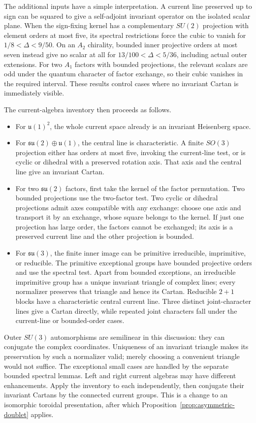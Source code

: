 The additional inputs have a simple interpretation.
A current line preserved up to sign can be squared to give a
self-adjoint invariant operator on the isolated scalar plane.
When the sign-fixing kernel has a complementary $SU(2)$
projection with element orders at most five, its spectral
restrictions force the cubic to vanish
for $1/8<\Delta<9/50$. On an $A_2$ chirality, bounded inner
projective orders at most seven instead give no scalar at all
for $13/100<\Delta<5/36$, including actual outer extensions.
For two $A_1$ factors with bounded projections, the relevant
scalars are odd under the quantum character of factor exchange,
so their cubic vanishes in the required interval. These results
control cases where no invariant Cartan is immediately visible.

The current-algebra inventory then proceeds as follows.
\begin{itemize}
\item For $\mathfrak u(1)^2$, the whole current space already is
an invariant Heisenberg space.
\item For $\mathfrak{su}(2)\oplus\mathfrak u(1)$, the central
line is characteristic. A finite $SO(3)$ projection either has
orders at most five, invoking the current-line test, or is cyclic
or dihedral with a preserved rotation axis. That axis and the
central line give an invariant Cartan.
\item For two $\mathfrak{su}(2)$ factors, first take the kernel
of the factor permutation. Two bounded projections use the
two-factor test. Two cyclic or dihedral projections admit axes
compatible with any exchange: choose one axis and transport it
by an exchange, whose square belongs to the kernel. If just one
projection has large order, the factors cannot be exchanged;
its axis is a preserved current line and the other projection
is bounded.
\item For $\mathfrak{su}(3)$, the finite inner image can be
primitive irreducible, imprimitive, or reducible. The primitive
exceptional groups have bounded projective orders and use the
spectral test. Apart from bounded exceptions, an irreducible
imprimitive group has a unique invariant triangle of complex
lines; every normalizer preserves that triangle and hence its
Cartan. Reducible $2+1$ blocks have a characteristic central
current line. Three distinct joint-character lines give a
Cartan directly, while repeated joint characters fall under
the current-line or bounded-order cases.
\end{itemize}

Outer $SU(3)$ automorphisms are semilinear in this discussion:
they can conjugate the complex coordinates. Uniqueness of an
invariant triangle makes its preservation by such a normalizer
valid; merely choosing a convenient triangle would not suffice.
The exceptional small cases are handled by the separate bounded
spectral lemmas. Left and right current algebras may have different
enhancements. Apply the inventory to each independently, then
conjugate their invariant Cartans by the connected current
groups. This is a change to an isomorphic toroidal presentation,
after which Proposition~\ref{prop:asymmetric-doublet} applies.


